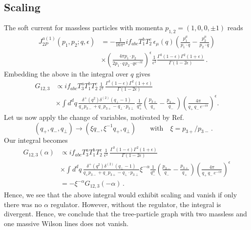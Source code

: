 \documentclass[a4paper,11pt]{report}
\numberwithin{equation}{section}
\begin{document}
\subsection*{Scaling}

The soft current for massless particles with momenta $p_{1,2} = (1,0,0,\pm 1)$
reads~\cite{Catani:2000pi}
%
\begin{align}
  J_{2P}^{a(1)}(p_1,p_2;q, \epsilon) & = 
  -\frac{1}{16\pi^2}  i f_{abc} T_1^b T_2^c\, \epsilon_\mu(q)
  \left(\frac{p_1^\mu}{p_1\cdot q}- \frac{p_2^\mu}{p_2\cdot q}\right)
  \nonumber \\
  & \times
  \left(\frac{4\pi p_1\cdot p_2}{2 p_1 \cdot q\, p_2 \cdot q e^{-i\pi}}
  \right)^\epsilon
  \frac{1}{\epsilon^2}
  \frac{\Gamma^3(1-\epsilon)\Gamma^2(1+\epsilon)}{\Gamma(1-2\epsilon)}\,.
\end{align}
%
Embedding the above in the integral over $q$ gives
%
\begin{align}
  G_{12,3} & \propto i f_{abc} T_3^a T_1^b T_2^c\,
  \frac{1}{\epsilon^2}\,
  \frac{\Gamma^3(1-\epsilon)\Gamma^2(1+\epsilon)}{\Gamma(1-2\epsilon)}
  \nonumber \\
  & \times
  \int d^d q\,
  \frac{\delta^+(q^2)\delta^{(2)}(q_\perp-1)}
       {q_+ p_{3-}+q_- p_{3+}-q_\perp \cdot p_{3\perp}}\,
  \frac{1}{q_+^\alpha}
  \left(\frac{p_{3+}}{q_+}- \frac{p_{3-}}{q_-}\right)
  \left(\frac{4\pi}{q_+\, q_-\, e^{-i\pi}}
  \right)^\epsilon.
\end{align}
%
Let us now apply the change of variables, motivated by Ref.~\cite{Aybat:2006wq}
%
\begin{equation}
  (q_+,q_-,q_\perp) \to (\xi q_-,\xi^{-1} q_+,q_\perp)
  \qquad
  \text{with} 
  \quad
  \xi = p_{3+}/p_{3-}\,.
  \quad
\end{equation}
%
Our integral becomes
%
\begin{align}
  G_{12,3} (\alpha) & \propto i f_{abc}  T_3^a T_1^b T_2^c \,
  \frac{1}{\epsilon^2}\,
  \frac{\Gamma^3(1-\epsilon)\Gamma^2(1+\epsilon)}{\Gamma(1-2\epsilon)}
  \nonumber \\
  & \times
  \int d^d q\, 
  \frac{\delta^+(q^2)\delta^{(2)}(q_\perp-1)}
       {q_+ p_{3-}+q_- p_{3+}-q_\perp \cdot
  p_{3\perp}}
  \xi^{-\alpha}\frac{1}{q_-^\alpha}
  \left(\frac{p_{3-}}{q_-} - \frac{p_{3+}}{q_+}\right)
  \left(\frac{4\pi}{q_+\, q_-\, e^{-i\pi}}
  \right)^\epsilon
  \nonumber \\
  & = - \xi^{-\alpha} G_{12,3}(-\alpha)\,.
\end{align}
%
Hence, we see that the above integral would exhibit scaling and vanish if only
there was no $\alpha$ regulator. However, without the regulator, the integral is
divergent. Hence, we conclude that the tree-particle graph with two massless and
one massive Wilson lines does not vanish.
\end{document}
